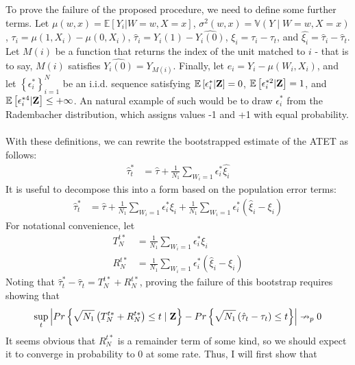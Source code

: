 \documentclass[10pt,letterpaper]{article}
\begin{document}
To prove the failure of the proposed procedure, we need to define some further terms. Let $\mu(w,x) = \mathbb{E}[Y_i | W = w, X = x]$, $\sigma^2(w,x) = \mathbb{V}(Y \mid W = w, X = x)$, $\tau_i = \mu(1,X_i) - \mu(0,X_i)$, $\hat{\tau}_i = Y_i(1) - \widehat{Y_i(0)}$, $\xi_i = \tau_i - \tau_t$, and $\hat{\xi_i} = \hat{\tau}_i - \hat{\tau}_t$. Let $M(i)$ be a function that returns the index of the unit matched to $i$ - that is to say, $M(i)$ satisfies $\widehat{Y_i(0)} = Y_{M(i)}$. Finally, let $e_i = Y_i - \mu(W_i, X_i)$, and let $\left\{\epsilon^*_i\right\}_{i=1}^{N}$ be an i.i.d. sequence satisfying $\mathbb{E}\left[\epsilon^*_i | \bold{Z}\right] = 0$, $\mathbb{E}\left[\epsilon_i^{*2} | \bold{Z} \right] = 1$, and $\mathbb{E}\left[\epsilon^{*4}_i |\bold{Z} \right] \leq +\infty$. An natural example of such would be to draw $\epsilon^*_i$ from the Radembacher distribution, which assigns values -1 and +1 with equal probability.\\ \\
With these definitions, we can rewrite the bootstrapped estimate of the ATET as follows:
\begin{align}
\hat{\tau}^*_t &= \hat{\tau} + \frac{1}{N_1} \sum_{W_i = 1} \epsilon_i^* \hat{\xi_i}
\end{align}
It is useful to decompose this into a form based on the population error terms:
\begin{align}
\hat{\tau}^*_t &= \hat{\tau} + \frac{1}{N_1} \sum_{W_i = 1} \epsilon_i^* \xi_i + \frac{1}{N_1} \sum_{W_i = 1} \epsilon_i^* \left(\hat{\xi}_i - \xi_i\right)
\end{align}
For notational convenience, let
\begin{align}
T_N^{t*} &= \frac{1}{N_1} \sum_{W_i = 1} \epsilon_i^* \xi_i \nonumber \\
R_N^{t*} &= \frac{1}{N_1} \sum_{W_i = 1} \epsilon_i^* \left(\hat{\xi}_i - \xi_i\right) \nonumber
\end{align}
Noting that $\hat{\tau}_t^* - \hat{\tau}_t = T_N^{t*} + R_N^{t*}$, proving the failure of this bootstrap requires showing that
\begin{align}
\sup_t \left\lvert Pr\left\{ \sqrt{N_1} \left(T_N^{t*} + R_N^{t*} \right) \leq t \mid \bold{Z} \right\} - Pr \left\{ \sqrt{N_1} \left( \hat{\tau}_t - \tau_t \right) \leq t \right\} \right\rvert \nrightarrow_p 0
\end{align}
It seems obvious that $R_N^{t*}$ is a remainder term of some kind, so we should expect it to converge in probability to 0 at some rate. Thus, I will first show that
\end{document}
